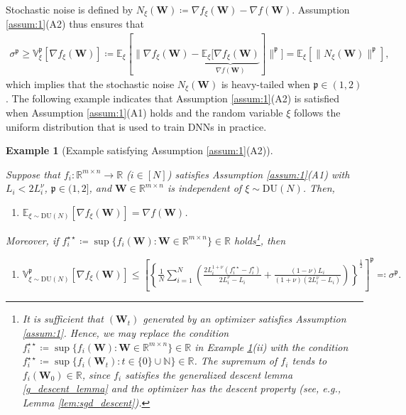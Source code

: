 \documentclass[twoside,11pt]{article}
\newtheorem{expl}{Example}[section]
\begin{document}
Stochastic noise is defined by $N_\xi (\bm{W}) \coloneqq \nabla f_\xi (\bm{W}) - \nabla f (\bm{W})$. Assumption \ref{assum:1}(A2) thus ensures that
\begin{align*}
\sigma^{\mathfrak{p}} 
\geq 
\mathbb{V}_{\xi}^{\mathfrak{p}}[\nabla f_{\xi}(\bm{W})] 
\coloneqq 
\mathbb{E}_{\xi}[\| \nabla f_{\xi}(\bm{W}) - \underbrace{\mathbb{E}_{\xi}[\nabla f_{\xi}(\bm{W})}_{\nabla f (\bm{W})}] \|^{\mathfrak{p}}] 
=
\mathbb{E}_{\xi}[ \| N_\xi (\bm{W}) \|^{\mathfrak{p}} ], 
\end{align*}  
which implies that the stochastic noise $N_\xi (\bm{W})$ is heavy-tailed when $\mathfrak{p} \in (1,2)$ \citep[Assumption 1]{DBLP:conf/nips/ZhangKVKRKS20}.
The following example indicates that Assumption \ref{assum:1}(A2) is satisfied when Assumption \ref{assum:1}(A1) holds and the random variable $\xi$ follows the uniform distribution that is used to train DNNs in practice.

\begin{expl}
[Example satisfying Assumption \ref{assum:1}(A2)]\label{exp:1} {\em Suppose that $f_i \colon \mathbb{R}^{m \times n} \to \mathbb{R}$ ($i\in [N]$) satisfies Assumption \ref{assum:1}(A1) with $L_i < 2 L_i^\nu$, $\mathfrak{p} \in (1,2]$, and $\bm{W} \in \mathbb{R}^{m \times n}$ is independent of $\xi \sim \mathrm{DU}(N)$. Then, 
\begin{enumerate}
\item[(i)]
$\displaystyle{
\mathbb{E}_{\xi \sim \mathrm{DU}(N)}[\nabla f_\xi (\bm{W})] = \nabla f (\bm{W})
}$.
\end{enumerate}
Moreover, if $f_i^{\star\star} \coloneqq \sup \{ f_i(\bm{W}) \colon \bm{W} \in \mathbb{R}^{m \times n} \} \in \mathbb{R}$ holds\footnote{It is sufficient that $(\bm{W}_t)$ generated by an optimizer satisfies Assumption \ref{assum:1}. Hence, we may replace the condition $f_i^{\star\star} \coloneqq \sup \{ f_i(\bm{W}) \colon \bm{W} \in \mathbb{R}^{m \times n} \} \in \mathbb{R}$ in Example \ref{exp:1}(ii) with the condition $f_i^{\star\star} \coloneqq \sup \{ f_i(\bm{W}_t) \colon t \in \{0\} \cup \mathbb{N} \} \in \mathbb{R}$. The supremum of $f_i$ tends to $f_i (\bm{W}_0) \in \mathbb{R}$, since $f_i$ satisfies the generalized descent lemma \eqref{g_descent_lemma} and the optimizer has the descent property (see, e.g., Lemma \ref{lem:sgd_descent}).}, then
\begin{enumerate}
\item[(ii)]
$\displaystyle{
\mathbb{V}_{\xi \sim \mathrm{DU}(N)}^{\mathfrak{p}}[\nabla f_\xi (\bm{W})]
\leq \left[ 
\left\{ \frac{1}{N} \sum_{i=1}^N
\left( \frac{2 L_i^{1 + \nu}(f_i^{\star\star} - f_i^{\star})}{2 L_i^\nu - L_i}
+ 
\frac{(1 - \nu) L_i}{(1 + \nu)(2 L_i^\nu - L_i)} 
\right) 
\right\}^{\frac{1}{2}}\right]^{\mathfrak{p}}
\eqqcolon \sigma^{\mathfrak{p}}
}.$
\end{enumerate}
}  
\end{expl}
\end{document}
